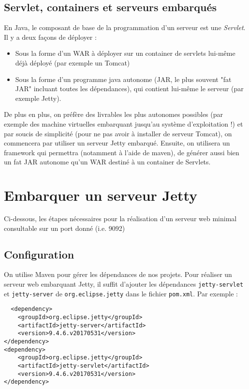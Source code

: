 \documentclass[11pt]{article}
\begin{document}
\subsection{Servlet, containers et serveurs embarqués}
\label{sec:org443ec7b}

En Java, le composant de base de la programmation d'un serveur est une
\emph{Servlet}. Il y a deux façons de déployer :
\begin{itemize}
\item Sous la forme d'un WAR à déployer sur un container de servlets lui-même déjà déployé (par exemple un Tomcat)
\item Sous la forme d'un programme java autonome (JAR, le plus souvent "fat JAR"
incluant toutes les dépendances), qui contient lui-même le serveur (par
exemple Jetty).
\end{itemize}

De plus en plus, on préfère des livrables les plus autonomes possibles (par
exemple des machine virtuelles embarquant jusqu'au système d'exploitation !) et
par soucis de simplicité (pour ne pas avoir à installer de serveur Tomcat), on
commencera par utiliser un serveur Jetty embarqué. Ensuite, on utilisera un
framework qui permettra (notamment à l'aide de maven), de générer aussi bien un
fat JAR autonome qu'un WAR destiné à un container de Servlets.


\section{Embarquer un serveur Jetty}
\label{sec:org1146290}

Ci-dessous, les étapes nécessaires pour la réalisation d'un serveur web minimal consultable sur un port donné (i.e. 9092)

\subsection{Configuration}
\label{sec:org4830d3b}

On utilise Maven pour gérer les dépendances de nos projets. Pour réaliser un
serveur web embarquant Jetty, il suffit d'ajouter les dépendances \texttt{jetty-servlet} et \texttt{jetty-server} de \texttt{org.eclipse.jetty} dans
le fichier \texttt{pom.xml}. Par exemple :

\begin{verbatim}
  <dependency>
    <groupId>org.eclipse.jetty</groupId>
    <artifactId>jetty-server</artifactId>
    <version>9.4.6.v20170531</version>
</dependency>
<dependency>
    <groupId>org.eclipse.jetty</groupId>
    <artifactId>jetty-servlet</artifactId>
    <version>9.4.6.v20170531</version>
</dependency>
\end{verbatim}
\end{document}
